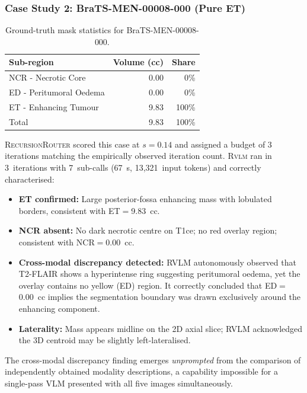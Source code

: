 \documentclass{article}
\newcommand{\RVLM}{\textsc{Rvlm}}
\newcommand{\RRouter}{\textsc{RecursionRouter}}
\begin{document}
	\subsubsection*{Case Study 2: BraTS-MEN-00008-000 (Pure ET)}
	
	\begin{table}[h]
		\centering
		\caption{Ground-truth mask statistics for BraTS-MEN-00008-000.}
		\label{tab:brats_gt}
		\begin{tabular}{lrr}
			\toprule
			\textbf{Sub-region} & \textbf{Volume (cc)} & \textbf{Share} \\
			\midrule
			NCR - Necrotic Core     & 0.00 & 0\% \\
			ED - Peritumoral Oedema & 0.00 & 0\% \\
			ET - Enhancing Tumour   & 9.83 & 100\% \\
			\midrule
			Total                     & 9.83 & 100\% \\
			\bottomrule
		\end{tabular}
	\end{table}
	
	\RRouter{} scored this case at $s = 0.14$ and assigned a budget of 3
	iterations matching the empirically observed iteration count.
	\RVLM{} ran in 3~iterations with 7~sub-calls (67~s, 13,321~input tokens)
	and correctly characterised:
	\begin{itemize}[nosep]
		\item \textbf{ET confirmed:} Large posterior-fossa enhancing mass with
		lobulated borders, consistent with ET$=$9.83~cc.
		\item \textbf{NCR absent:} No dark necrotic centre on T1ce; no red
		overlay region; consistent with NCR$=$0.00~cc.
		\item \textbf{Cross-modal discrepancy detected:} RVLM autonomously
		observed that T2-FLAIR shows a hyperintense ring suggesting peritumoral
		oedema, yet the overlay contains no yellow (ED) region.
		It correctly concluded that ED$=$0.00~cc implies the segmentation
		boundary was drawn exclusively around the enhancing component.
		\item \textbf{Laterality:} Mass appears midline on the 2D axial slice;
		RVLM acknowledged the 3D centroid may be slightly left-lateralised.
	\end{itemize}
	
	The cross-modal discrepancy finding emerges \emph{unprompted} from the
	comparison of independently obtained modality descriptions, a capability
	impossible for a single-pass VLM presented with all five images
	simultaneously.
	
\end{document}
